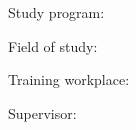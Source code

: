 

Study program: \myStudyProgram

Field of study: \myStudyField

Training workplace: \myInstitude

Supervisor: \mySupervisor

\medskip{}

\myDate


\newpage
\thispagestyle{empty}
\mbox{}
\newpage

